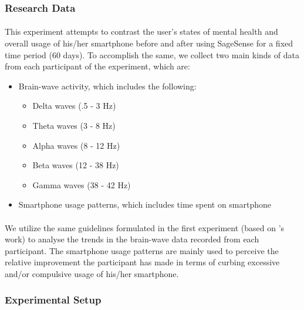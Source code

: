 \documentclass{article}
\begin{document}
\subsubsection{Research Data}

\paragraph{} This experiment attempts to contrast the user's states of mental health and overall usage of his/her smartphone before and after using SageSense for a fixed time period (60 days). To accomplish the same, we collect two main kinds of data from each participant of the experiment, which are:

\begin{itemize}
    \item Brain-wave activity, which includes the following:
    \begin{itemize}[label=$\ast$]
        \item Delta waves (.5 - 3 Hz)
        \item Theta waves (3 - 8 Hz)
        \item Alpha waves (8 - 12 Hz)
        \item Beta waves (12 - 38 Hz)
        \item Gamma waves (38 - 42 Hz)
    \end{itemize}
    \item Smartphone usage patterns, which includes time spent on smartphone
\end{itemize}

\paragraph{} We utilize the same guidelines formulated in the first experiment (based on \citeauthor{buzsaki2006rhythms}'s work\cite{buzsaki2006rhythms}) to analyse the trends in the brain-wave data recorded from each participant. The smartphone usage patterns are mainly used to perceive the relative improvement the participant has made in terms of curbing excessive and/or compulsive usage of his/her smartphone.

\subsubsection{Experimental Setup}
\end{document}
